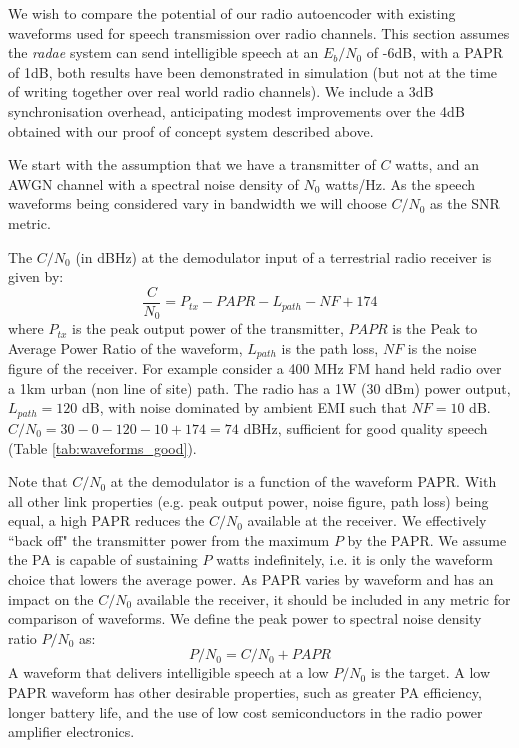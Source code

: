 \documentclass{article}
\begin{document}
We wish to compare the potential of our radio autoencoder with existing waveforms used for speech transmission over radio channels.  This section assumes the \emph{radae} system can send intelligible speech at an $E_b/N_0$ of -6dB, with a PAPR of 1dB, both results have been demonstrated in simulation (but not at the time of writing together over real world radio channels).  We include a 3dB synchronisation overhead, anticipating modest improvements over the 4dB obtained with our proof of concept system described above.

We start with the assumption that we have a transmitter of $C$ watts, and an AWGN channel with a spectral noise density of $N_0$ watts/Hz. As the speech waveforms being considered vary in bandwidth we will choose $C/N_0$ as the SNR metric.

The $C/N_0$ (in dBHz) at the demodulator input of a terrestrial radio receiver is given by:
\begin{equation}
\frac{C}{N_0} = P_{tx} - PAPR - L_{path} - NF + 174
\end{equation}
where $P_{tx}$ is the peak output power of the transmitter, $PAPR$ is the Peak to Average Power Ratio of the waveform, $L_{path}$ is the path loss, $NF$ is the noise figure of the receiver.  For example consider a 400 MHz FM hand held radio over a 1km urban (non line of site) path.  The radio has a 1W (30 dBm) power output, $L_{path}=120$ dB, with noise dominated by ambient EMI such that $NF=10$ dB. $C/N_0 = 30 - 0 - 120 - 10 + 174 = 74$ dBHz, sufficient for good quality speech (Table \ref{tab:waveforms_good}).

Note that $C/N_0$ at the demodulator is a function of the waveform PAPR.  With all other link properties (e.g. peak output power, noise figure, path loss) being equal, a high PAPR reduces the $C/N_0$ available at the receiver.  We effectively ``back off" the transmitter power from the maximum $P$ by the PAPR.  We assume the PA is capable of sustaining $P$ watts indefinitely, i.e. it is only the waveform choice that lowers the average power. As PAPR varies by waveform and has an impact on the $C/N_0$ available the receiver, it should be included in any metric for comparison of waveforms.  We define the peak power to spectral noise density ratio $P/N_0$ as:
\begin{equation}
P/N_0 = C/N_0 + PAPR
\end{equation} 
A waveform that delivers intelligible speech at a low $P/N_0$ is the target.  A low PAPR waveform has other desirable properties, such as greater PA efficiency, longer battery life, and the use of low cost semiconductors in the radio power amplifier electronics.
\end{document}

